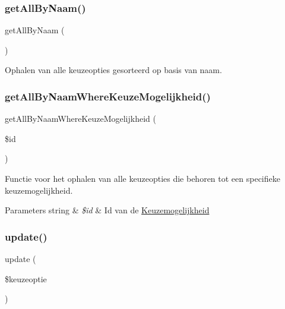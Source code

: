 \subsubsection{\texorpdfstring{get\+All\+By\+Naam()}{getAllByNaam()}}
{\footnotesize\ttfamily get\+All\+By\+Naam (\begin{DoxyParamCaption}{ }\end{DoxyParamCaption})}



Ophalen van alle keuzeopties gesorteerd op basis van naam. 

\mbox{\label{class_keuzeoptie___model_a6f3e4d26ab480501524eabb01683f5f7}} 
\subsubsection{\texorpdfstring{get\+All\+By\+Naam\+Where\+Keuze\+Mogelijkheid()}{getAllByNaamWhereKeuzeMogelijkheid()}}
{\footnotesize\ttfamily get\+All\+By\+Naam\+Where\+Keuze\+Mogelijkheid (\begin{DoxyParamCaption}\item[{}]{\$id }\end{DoxyParamCaption})}



Functie voor het ophalen van alle keuzeopties die behoren tot een specifieke keuzemogelijkheid. 


\begin{DoxyParams}[1]{Parameters}
string & {\em \$id} & Id van de \mbox{\hyperlink{class_keuzemogelijkheid}{Keuzemogelijkheid}} \\
\hline
\end{DoxyParams}
\mbox{\label{class_keuzeoptie___model_a9d98d1a6c3919a0e7b946d37fa385948}} 
\subsubsection{\texorpdfstring{update()}{update()}}
{\footnotesize\ttfamily update (\begin{DoxyParamCaption}\item[{}]{\$keuzeoptie }\end{DoxyParamCaption})}



